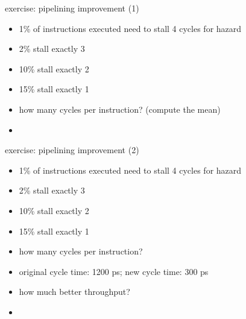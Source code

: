 \begin{frame}{exercise: pipelining improvement (1)}
    \begin{itemize}
    \item 1\% of instructions executed need to stall 4 cycles for hazard
    \item 2\% stall exactly 3
    \item 10\% stall exactly 2
    \item 15\% stall exactly 1
    \vspace{.5cm}
    \item how many cycles per instruction? (compute the mean)
    \item<2-> \iftoggle{heldback}{~}{$1 + .15 \times 1 + .10 \times 2 + .02 \times 3 + .01 \times 4 = 1.45$}
    \end{itemize}
\end{frame}

\begin{frame}{exercise: pipelining improvement (2)}
    \begin{itemize}
    \item 1\% of instructions executed need to stall 4 cycles for hazard
    \item 2\% stall exactly 3
    \item 10\% stall exactly 2
    \item 15\% stall exactly 1
    \item how many cycles per instruction? \iftoggle{heldback}{}{$1.45$}
    \item original cycle time: 1200 ps; new cycle time: 300 ps
    \vspace{.5cm}
    \item how much better throughput? 
    \item<2-> \iftoggle{heldback}{~}{1 every ($1.45 \times 300 = 435$ ps) versus 1 every 1200 --- $2.76$ faster}
    \end{itemize}
\end{frame}
